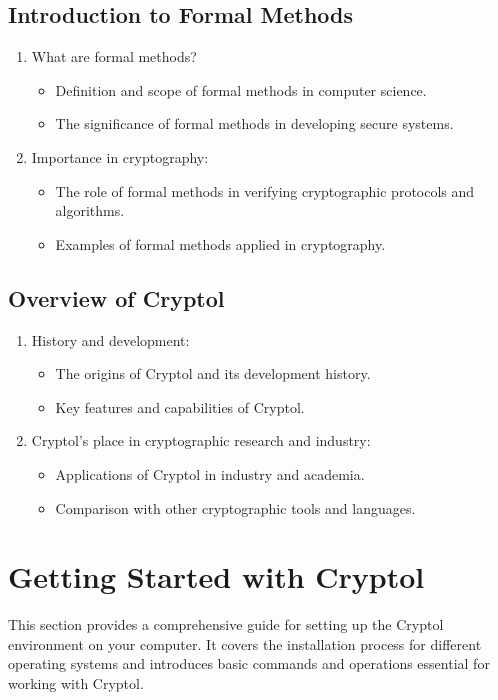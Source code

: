 \subsection{Introduction to Formal Methods}
\begin{enumerate}
	\item What are formal methods?
	\begin{itemize}
		\item Definition and scope of formal methods in computer science.
		\item The significance of formal methods in developing secure systems.
	\end{itemize}
	\item Importance in cryptography:
	\begin{itemize}
		\item The role of formal methods in verifying cryptographic protocols and algorithms.
		\item Examples of formal methods applied in cryptography.
	\end{itemize}
\end{enumerate}

\subsection{Overview of Cryptol}
\begin{enumerate}
	\item History and development:
	\begin{itemize}
		\item The origins of Cryptol and its development history.
		\item Key features and capabilities of Cryptol.
	\end{itemize}
	\item Cryptol's place in cryptographic research and industry:
	\begin{itemize}
		\item Applications of Cryptol in industry and academia.
		\item Comparison with other cryptographic tools and languages.
	\end{itemize}
\end{enumerate}

\newpage
\section{Getting Started with Cryptol}
This section provides a comprehensive guide for setting up the Cryptol environment on your computer. It covers the installation process for different operating systems and introduces basic commands and operations essential for working with Cryptol.
